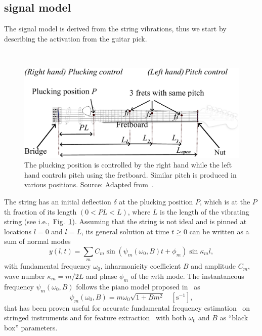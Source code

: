 \documentclass{article}
\begin{document}
\begin{sloppy}
\section{signal model}
The signal model is derived from the string vibrations, thus we start by describing the activation from the guitar pick. 
%
\begin{figure}[t]\
  \centering
  \centerline{\includegraphics[width=.95\columnwidth]{img/fender_drawing4.png}}
  \caption{The plucking position is controlled by the right hand while the left hand controls pitch using the fretboard. Similar pitch is produced in various positions. Source: Adapted from~\cite{phillips}.
  }\label{fig:guitar_overview}\vspace{-2mm}
\end{figure}
%
The string has an initial deflection $\delta$ at the plucking position $P$, which is at the $P$th fraction of its length $(0<PL<L)$, where $L$ is the length of the vibrating string (see i.e.,~Fig.~\ref{fig:guitar_overview}). Assuming that the string is not ideal and is pinned at locations $l=0$ and $l=L$, its general solution at time $t\geq0$ can be written as a sum of normal modes~\cite{fletcher:physics_of_musical_instruments}
%
\begin{equation}\label{eq:modalSum}
    y(l,t) = \sum_m C_m\sin(\psi_m(\omega_0,B)t+\phi_m)\sin\kappa_ml,
\end{equation}
%
with fundamental frequency $\omega_0$, inharmonicity coefficient $B$ and amplitude $C_m$, wave number $\kappa_m = m/ 2L$ and phase $\phi_m$ of the $m$th mode. The instantaneous frequency $\psi_m(\omega_0,B)$ follows the piano model proposed in~\cite{fletcher:piano_model} as 
\begin{equation}\label{eq:pianoModel}
  \psi_m(\omega_0,B) = m \omega_0 \sqrt{1+B m^2} \quad [\text{s}^{-1}], 
\end{equation}
that has been proven useful for accurate fundamental frequency estimation~\cite{galembo1994measuring, nillson:multipitch_inharmonic_signals} on stringed instruments and for feature extraction~\cite{michelson2018_aes,abesser2012feature,barbancho:inharmonicity_tablature} with both $\omega_0$ and $B$ as ``black box'' parameters.

\end{sloppy}
\end{document}
